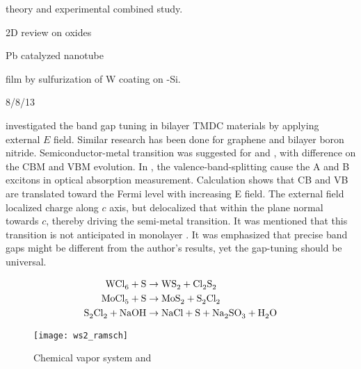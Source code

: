 theory and experimental combined study. \cite{Klein2001}

2D review on oxides \cite{Osada2012} 

Pb catalyzed  nanotube \cite{Brontvein2012}

 film by sulfurization of W coating on -Si.\cite{Shanmugam2012a}

8/8/13

\citeauthor{Ramasubramaniam2011} investigated the band gap tuning in bilayer TMDC materials by applying external $E$ field. Similar research has been done for graphene and bilayer boron nitride. Semiconductor-metal transition was suggested for  and , with difference on the CBM and VBM evolution. In , the valence-band-splitting cause the A and B excitons in optical absorption measurement. Calculation shows that CB and VB are translated toward the Fermi level with increasing E field.  The external field localized charge along $c$ axis, but delocalized that within the plane normal towards $c$, thereby driving the semi-metal transition. It was mentioned that this transition is not anticipated in monolayer . It was emphasized that precise band gaps might be different from the author’s results, yet the gap-tuning should be universal.\cite{Ramasubramaniam2011}


\begin{align}
\cee{WCl6 + S &\rightarrow WS2 + Cl2S2}\\
\cee{MoCl5 + S &\rightarrow MoS2 + S2Cl2} \\
\cee{S2Cl2 + NaOH &\rightarrow NaCl + S + Na2SO3 + H2O}
\end{align}

\begin{figure}[htb]
\centering
\texttt{[image: ws2\_ramsch]}
\caption[CVD system]{Chemical vapor system and \cite{Ghorbani-asl}}
\label{fig:ws2ramsch}
\end{figure}

